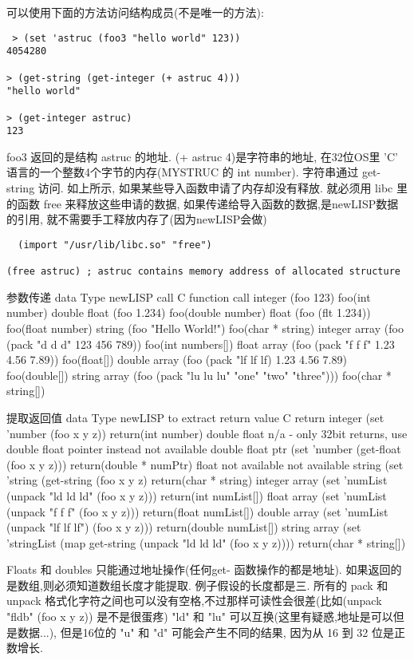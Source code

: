 \documentclass[cn,11pt]{elegantbook}
\begin{document}
可以使用下面的方法访问结构成员(不是唯一的方法):
\begin{lstlisting}
 > (set 'astruc (foo3 "hello world" 123))
4054280
 
> (get-string (get-integer (+ astruc 4)))
"hello world"
 
> (get-integer astruc)
123
\end{lstlisting}
foo3 返回的是结构 astruc 的地址. (+ astruc 4)是字符串的地址, 在32位OS里 'C' 语言的一个整数4个字节的内存(MYSTRUC 的 int number). 字符串通过 get-string 访问.
如上所示, 如果某些导入函数申请了内存却没有释放. 就必须用 libc 里的函数 free 来释放这些申请的数据,
如果传递给导入函数的数据,是newLISP数据的引用, 就不需要手工释放内存了(因为newLISP会做)
\begin{lstlisting}
  (import "/usr/lib/libc.so" "free")

(free astruc) ; astruc contains memory address of allocated structure
\end{lstlisting}

参数传递
data Type	newLISP call	C function call
integer	(foo 123)	foo(int number)
double float	(foo 1.234)	foo(double number)
float	(foo (flt 1.234))	foo(float number)
string	(foo "Hello World!")	foo(char * string)
integer array	(foo (pack "d d d" 123 456 789))	foo(int numbers[])
float array	(foo (pack "f f f" 1.23 4.56 7.89))	foo(float[])
double array	(foo (pack "lf lf lf) 1.23 4.56 7.89)	foo(double[])
string array	(foo (pack "lu lu lu" "one" "two" "three")))	foo(char * string[])


提取返回值
data Type	newLISP to extract return value	C return
integer	(set 'number (foo x y z))	return(int number)
double float	n/a - only 32bit returns, use double float pointer instead	not available
double float ptr	(set 'number (get-float (foo x y z)))	return(double * numPtr)
float	not available	not available
string	(set 'string (get-string (foo x y z)	return(char * string)
integer array	(set 'numList (unpack "ld ld ld" (foo x y z)))	return(int numList[])
float array	(set 'numList (unpack "f f f" (foo x y z)))	return(float numList[])
double array	(set 'numList (unpack "lf lf lf") (foo x y z)))	return(double numList[])
string array	(set 'stringList (map get-string (unpack "ld ld ld" (foo x y z))))	return(char * string[])


Floats 和 doubles 只能通过地址操作(任何get- 函数操作的都是地址).
如果返回的是数组,则必须知道数组长度才能提取. 例子假设的长度都是三.
所有的 pack 和 unpack 格式化字符之间也可以没有空格,不过那样可读性会很差(比如(unpack "fldb" (foo x y z)) 是不是很蛋疼)
"ld" 和 "lu" 可以互换(这里有疑惑,地址是可以但是数据...), 但是16位的 "u" 和 "d" 可能会产生不同的结果, 因为从 16 到 32 位是正数增长.
\end{document}
